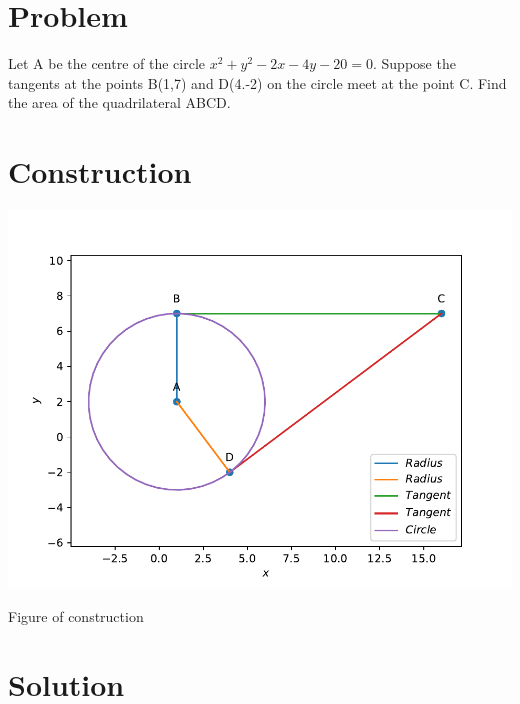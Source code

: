 \documentclass[10pt, a4paper]{article}
\title{\mytitle}
\author{\myauthor\hspace{1em}\\\contact\\FWC22034\hspace{6.5em}IITH\hspace{0.5em}\mymodule\hspace{6em}Assignment}
\begin{document}
	\maketitle
	\tableofcontents
   \section{Problem}
  Let A be the centre of the circle $x^2 + y^2-2x-4y-20=0$. Suppose the tangents at the points  B(1,7) and D(4.-2) on the circle meet at the point C. Find the area of the quadrilateral ABCD.
\section{Construction}
  \includegraphics[scale=0.47]{matrix.pdf}
  	\begin{center}
  Figure of construction
  	\end{center}
  \section{Solution}
\end{document}
